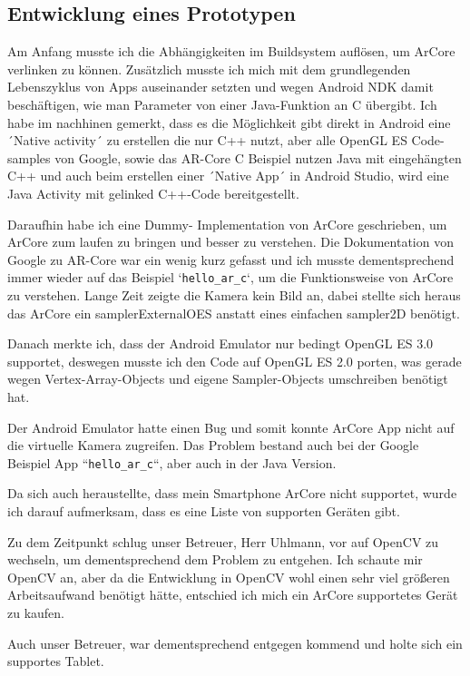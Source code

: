 \subsection{Entwicklung eines Prototypen}
Am Anfang musste ich die Abhängigkeiten im Buildsystem auflösen, um
ArCore verlinken zu können. Zusätzlich musste ich mich mit dem grundlegenden Lebenszyklus von Apps
auseinander setzten und wegen Android NDK damit beschäftigen, wie man
Parameter von einer Java-Funktion an C übergibt.
Ich habe im nachhinen gemerkt, dass es die Möglichkeit gibt direkt in Android eine
´Native activity´\cite{android_native_activity} zu erstellen die nur C++ nutzt, aber alle OpenGL ES Code-samples von Google\cite{android_ndk_samples_2021},
sowie das AR-Core C Beispiel\cite{ar_core_sdk} nutzen Java mit eingehängten C++ und auch beim erstellen einer
´Native App´ in Android Studio, wird eine Java Activity mit gelinked C++-Code bereitgestellt.
\par
Daraufhin habe ich eine Dummy-
Implementation von ArCore geschrieben, um ArCore zum laufen zu bringen und besser zu verstehen.
Die Dokumentation von Google zu AR-Core war ein wenig kurz gefasst und ich musste dementsprechend immer wieder auf das Beispiel `\verb|hello_ar_c|`, um die Funktionsweise von ArCore zu verstehen.
Lange Zeit zeigte die Kamera kein Bild an, dabei stellte sich heraus das ArCore ein samplerExternalOES anstatt eines einfachen sampler2D benötigt.
\par
Danach merkte ich, dass der Android Emulator nur bedingt OpenGL ES 3.0 supportet\cite{android_emulator_gles3_issue},
deswegen musste ich den Code auf OpenGL ES 2.0 porten, was gerade wegen
Vertex-Array-Objects und eigene Sampler-Objects
umschreiben benötigt hat.
\par
Der Android Emulator hatte einen Bug und somit konnte ArCore App nicht
auf die virtuelle Kamera zugreifen. Das Problem bestand auch bei der Google Beispiel App
``\verb|hello_ar_c|``, aber auch in der Java Version.
\par
Da sich auch heraustellte, dass mein Smartphone ArCore nicht supportet, wurde ich darauf
aufmerksam, dass es eine Liste von supporten Geräten gibt. \cite{ar_core_supported_devices}
\par
Zu dem Zeitpunkt schlug unser Betreuer, Herr Uhlmann, vor auf OpenCV\cite{openCV} zu wechseln, um dementsprechend dem Problem
zu entgehen. Ich schaute mir OpenCV an, aber da die Entwicklung in OpenCV wohl einen sehr viel
größeren Arbeitsaufwand benötigt hätte, entschied ich mich ein ArCore supportetes Gerät zu kaufen.
\par
Auch unser Betreuer, war dementsprechend entgegen kommend und holte sich ein supportes Tablet.

